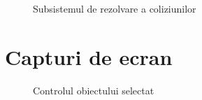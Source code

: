 \documentclass[12pt,a4paper]{report}
\begin{document}
\begin{appendices}
\begin{figure}[H]
	\centering
	\caption[]{Subsistemul de rezolvare a coliziunilor}
	\label{fig:CollisionResolution}
\end{figure}

\chapter{Capturi de ecran}
\begin{figure}[H]
	\centering
	\caption[]{Controlul obiectului selectat}
	\label{fig:gui_object_control}
\end{figure}


\end{appendices}
\end{document}
